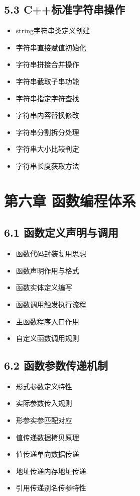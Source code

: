 \subsection{5.3 C++标准字符串操作}
\begin{itemize}
\item string字符串类定义创建
\item 字符串直接赋值初始化
\item 字符串拼接合并操作
\item 字符串截取子串功能
\item 字符串指定字符查找
\item 字符串内容替换修改
\item 字符串分割拆分处理
\item 字符串大小比较判定
\item 字符串长度获取方法
\end{itemize}

\section{第六章 函数编程体系}
\subsection{6.1 函数定义声明与调用}
\begin{itemize}
\item 函数代码封装复用思想
\item 函数声明作用与格式
\item 函数实体定义编写
\item 函数调用触发执行流程
\item 主函数程序入口作用
\item 自定义函数调用规则
\end{itemize}

\subsection{6.2 函数参数传递机制}
\begin{itemize}
\item 形式参数定义特性
\item 实际参数传入规则
\item 形参实参匹配对应
\item 值传递数据拷贝原理
\item 值传递单向数据传递
\item 地址传递内存地址传递
\item 引用传递别名传参特性
\end{itemize}

